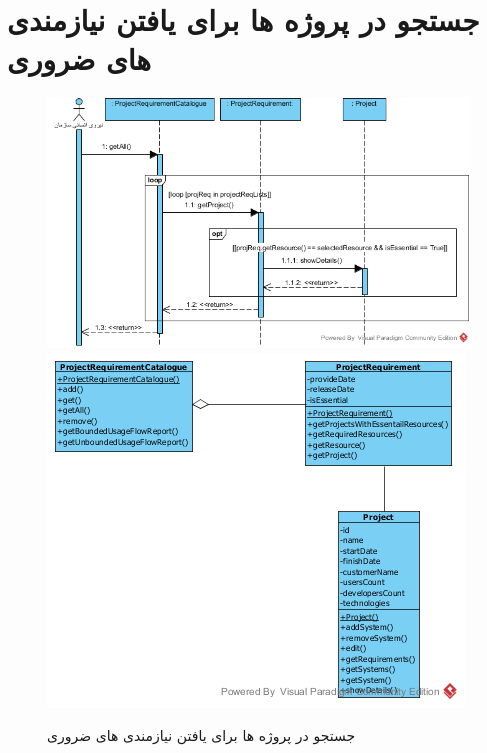 \section{جستجو در پروژه ها برای یافتن نیازمندی های ضروری}
\begin{figure}[H]
	\centering
	\includegraphics[scale=0.7]{img/sequence-analysis/SearchForEssentialRequirements}
	\includegraphics[scale=0.7]{img/sequence-analysis/SearchForEssentialRequirementsC}
	\caption{جستجو در پروژه ها برای یافتن نیازمندی های ضروری}
\end{figure}


